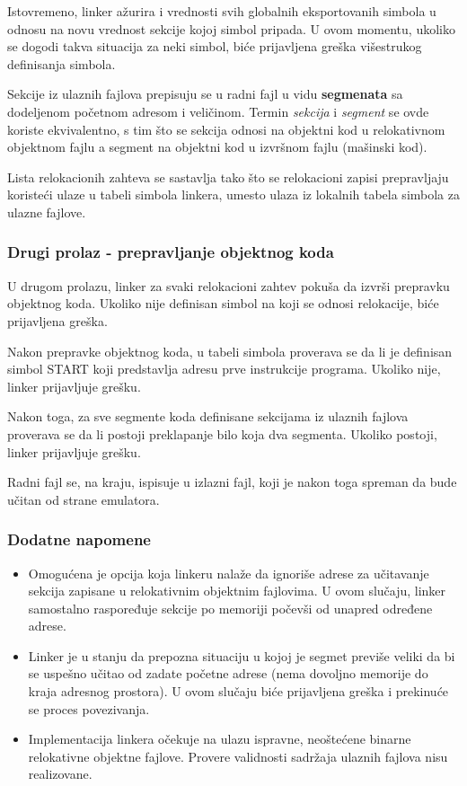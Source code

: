 Istovremeno, linker ažurira i vrednosti svih
globalnih eksportovanih si\-mbola u odnosu na novu vrednost sekcije kojoj simbol
pripada. U ovom momentu, ukoliko se dogodi takva situacija za neki simbol,
biće prijavljena greška višestrukog definisanja simbola.

Sekcije iz ulaznih fajlova prepisuju se u radni fajl u vidu \textbf{segmenata} sa dodeljenom
početnom adresom i veličinom. Termin \textit{sekcija} i \textit{segment} se ovde koriste
ekvivalentno, s tim što se sekcija odnosi na objektni kod u relokativnom objektnom fajlu
a segment na objektni kod u izvršnom fajlu (mašinski kod).

Lista relokacionih zahteva se sastavlja tako što se relokacioni zapisi pre\-pravljaju
koristeći ulaze u tabeli simbola linkera, umesto ulaza iz lokalnih tabela simbola
za ulazne fajlove.

\subsubsection{Drugi prolaz - prepravljanje objektnog koda}
U drugom prolazu, linker za svaki relokacioni zahtev pokuša da izvrši prepra\-vku
objektnog koda. Ukoliko nije definisan simbol na koji se odnosi relokacije, biće
prijavljena greška.

Nakon prepravke objektnog koda, u tabeli simbola proverava se da li je definisan
simbol START koji predstavlja adresu prve instrukcije programa.
Ukoliko nije, linker prijavljuje grešku.

Nakon toga, za sve segmente koda definisane sekcijama iz ulaznih fajlova proverava
se da li postoji preklapanje bilo koja dva segmenta. Ukoliko postoji, linker
prijavljuje grešku.

Radni fajl se, na kraju, ispisuje u izlazni fajl, koji je nakon toga spreman da bude
učitan od strane emulatora.

\subsubsection{Dodatne napomene}
\begin{itemize}
    \item Omogućena je opcija koja linkeru nalaže da ignoriše adrese za učitava\-nje
          sekcija zapisane u relokativnim objektnim fajlovima. U ovom slu\-čaju, linker
          samostalno raspoređuje sekcije po memoriji počevši od unapred određene
          adrese.
    \item Linker je u stanju da prepozna situaciju u kojoj je segmet previše veliki
          da bi se uspešno učitao od zadate početne adrese (nema dovoljno memorije
          do kraja adresnog prostora). U ovom slučaju biće prijavljena greška i
          prekinuće se proces povezivanja.
    \item Implementacija linkera očekuje na ulazu ispravne, neoštećene binarne
          relokativne objektne fajlove. Provere validnosti sadržaja ulaznih fajlova
          nisu realizovane.
\end{itemize}



